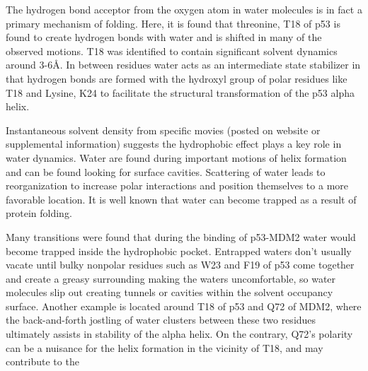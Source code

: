 The hydrogen bond acceptor from the oxygen atom in water molecules is in
fact a primary mechanism of folding. Here, it is found that threonine,
T18 of p53 is found to create hydrogen bonds with water and is shifted
in many of the observed motions. T18 was identified to contain
significant solvent dynamics around 3-6Å. In between residues water acts
as an intermediate state stabilizer in that hydrogen bonds are formed
with the hydroxyl group of polar residues like T18 and Lysine, K24 to
facilitate the structural transformation of the p53 alpha helix.

Instantaneous solvent density from specific movies (posted on website or
supplemental information) suggests the hydrophobic effect plays a key
role in water dynamics. Water are found during important motions of
helix formation and can be found looking for surface cavities.
Scattering of water leads to reorganization to increase polar
interactions and position themselves to a more favorable location. It is
well known that water can become trapped as a result of protein folding.

Many transitions were found that during the binding of p53-MDM2 water
would become trapped inside the hydrophobic pocket. Entrapped waters
don't usually vacate until bulky nonpolar residues such as W23 and F19
of p53 come together and create a greasy surrounding making the waters
uncomfortable, so water molecules slip out creating tunnels or cavities
within the solvent occupancy surface. Another example is located around
T18 of p53 and Q72 of MDM2, where the back-and-forth jostling of water
clusters between these two residues ultimately assists in stability of
the alpha helix. On the contrary, Q72's polarity can be a nuisance for
the helix formation in the vicinity of T18, and may contribute to the
